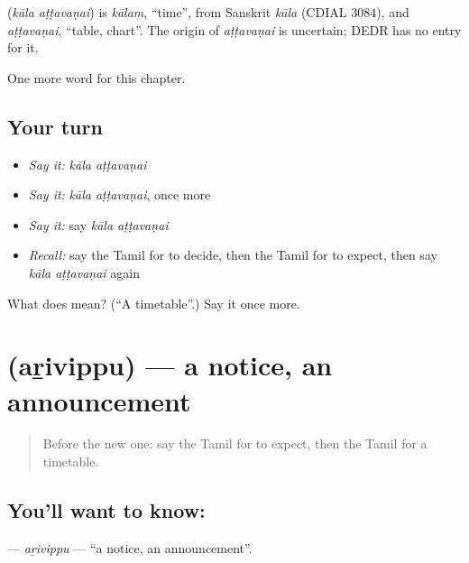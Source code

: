 \begin{cousinweb}
\textbf{ } (\emph{kāla aṭṭavaṇai}) is \emph{kālam}, \textquotedblleft{}time\textquotedblright{}, from Sanskrit \emph{kāla} (CDIAL 3084), and \emph{aṭṭavaṇai}, \textquotedblleft{}table, chart\textquotedblright{}. The origin of \emph{aṭṭavaṇai} is uncertain; DEDR has no entry for it.
\end{cousinweb}

\begin{grammarlens}[title={What you've built}]
One more word for this chapter.
\end{grammarlens}

\subsection*{Your turn}
\begin{itemize}
\raggedright
  \item \emph{Say it:} \emph{kāla aṭṭavaṇai}
  \item \emph{Say it:} \emph{kāla aṭṭavaṇai}, once more
  \item \emph{Say it:} say \emph{kāla aṭṭavaṇai}
  \item \emph{Recall:} say the Tamil for to decide, then the Tamil for to expect, then say \emph{kāla aṭṭavaṇai} again
\end{itemize}

\begin{tcolorbox}[breakable,colback=teal!4,colframe=teal!35!black,title={Before you move on}]
What does   mean? (\textquotedblleft{}A timetable\textquotedblright{}.) Say it once more.
\end{tcolorbox}
\section[\texorpdfstring{\ta{அறிவிப்பு} (aṟivippu)}{அறிவிப்பு (aṟivippu)}]{ (aṟivippu) — a notice, an announcement}

\label{lesson:TA-C160-arivippu}



\begin{quote}
Before the new one: say the Tamil for to expect, then the Tamil for a timetable.
\end{quote}

\subsection*{You'll want to know: }
\textbf{} — \emph{aṟivippu} — \textquotedblleft{}a notice, an announcement\textquotedblright{}.

